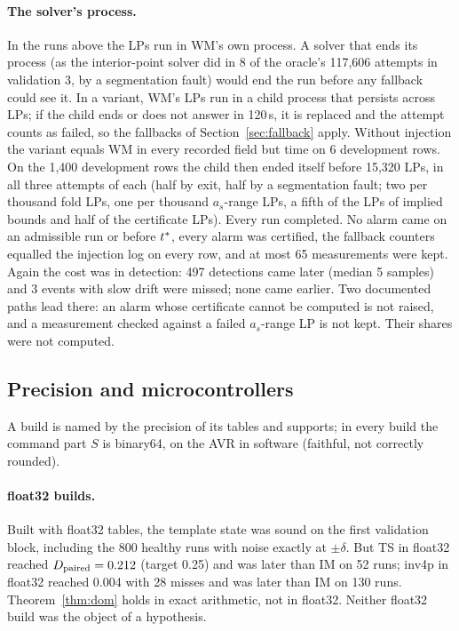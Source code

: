 \paragraph{The solver's process.} In the runs above the LPs run in WM's own process. A solver that ends its process (as
the interior-point solver did in 8 of the oracle's 117,606 attempts in validation 3, by a segmentation fault) would end
the run before any fallback could see it. In a variant, WM's LPs run in a child process that persists across LPs; if
the child ends or does not answer in 120\,s, it is replaced and the attempt counts as failed, so the fallbacks of
Section~\ref{sec:fallback} apply. Without injection the variant equals WM in every recorded field but time on 6 development
rows. On the 1,400 development rows the child then ended itself before 15,320 LPs, in all three attempts of each (half
by exit, half by a segmentation fault; two per thousand fold LPs, one per thousand $a_s$-range LPs, a fifth of the LPs
of implied bounds and half of the certificate LPs). Every run completed. No alarm came on an admissible run or before
$t^{\ast}$, every alarm was certified, the fallback counters equalled the injection log on every row, and at most 65
measurements were kept. Again the cost was in detection: 497 detections came later (median 5 samples) and 3 events
with slow drift were missed; none came earlier. Two documented paths lead there: an alarm whose certificate cannot be
computed is not raised, and a measurement checked against a failed $a_s$-range LP is not kept. Their shares were not
computed.

\subsection{Precision and microcontrollers}\label{sec:mcu}

A build is named by the precision of its tables and supports; in every build the command part $S$ is binary64, on
the AVR in software (faithful, not correctly rounded).

\paragraph{float32 builds.} Built with float32 tables, the template state was sound on the first validation block,
including the 800 healthy runs with noise exactly at $\pm\delta$. But TS in float32 reached $D_{\mathrm{paired}} = 0.212$ (target 0.25)
and was later than IM on 52 runs; inv4p in float32 reached 0.004 with 28 misses and was later than IM on 130 runs.
Theorem~\ref{thm:dom} holds in exact arithmetic, not in float32. Neither float32 build was the object of a hypothesis.

